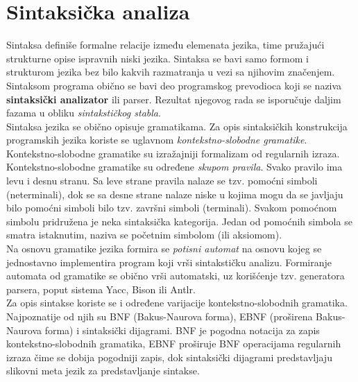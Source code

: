 \documentclass[10pt]{extarticle}
\begin{document}
\section{Sintaksička analiza}
\noindent
Sintaksa definiše formalne relacije između elemenata jezika, time pružajući strukturne opise ispravnih niski jezika. Sintaksa se bavi samo formom i strukturom
jezika bez bilo kakvih razmatranja u vezi sa njihovim značenjem. Sintaksom programa obično se bavi deo programskog prevodioca koji se naziva \textbf{sintaksički analizator} ili parser. Rezultat njegovog rada se isporučuje daljim fazama u obliku \textit{sintakstičkog stabla}. \\
Sintaksa jezika se obično opisuje gramatikama. Za opis sintaksičkih konstrukcija programskih jezika koriste se uglavnom \textit{kontekstno-slobodne gramatike}.
Kontekstno-slobodne gramatike su izražajniji formalizam od regularnih izraza. \\
Kontekstno-slobodne gramatike su određene \textit{skupom pravila}. Svako pravilo ima levu i desnu stranu. Sa leve strane pravila nalaze se tzv. pomoćni simboli (neterminali), dok se sa desne strane nalaze niske u kojima mogu da se javljaju bilo pomoćni simboli bilo tzv. završni simboli (terminali).
Svakom pomoćnom simbolu pridružena je neka sintaksička kategorija. Jedan od pomoćnih simbola se smatra istaknutim, naziva se početnim simbolom (ili aksiomom). \\
Na osnovu gramatike jezika formira se \textit{potisni automat} na osnovu kojeg se jednostavno implementira program koji vrši sintakstičku analizu. Formiranje automata od gramatike se obično vrši automatski, uz korišćenje tzv. generatora parsera, poput sistema Yacc, Bison ili Antlr. \\
Za opis sintakse koriste se i određene varijacije kontekstno-slobodnih gramatika. Najpoznatije od njih su BNF (Bakus-Naurova forma), EBNF (proširena Bakus-Naurova forma) i sintaksički dijagrami. BNF je pogodna notacija za zapis kontekstno-slobodnih gramatika, EBNF proširuje BNF operacijama regularnih izraza čime se dobija pogodniji zapis, dok sintaksički dijagrami predstavljaju slikovni meta jezik za predstavljanje sintakse.
\end{document}
